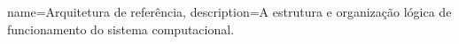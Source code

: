 {
    name=Arquitetura de referência,
    description={A estrutura e organização lógica de funcionamento do sistema computacional.}
}

